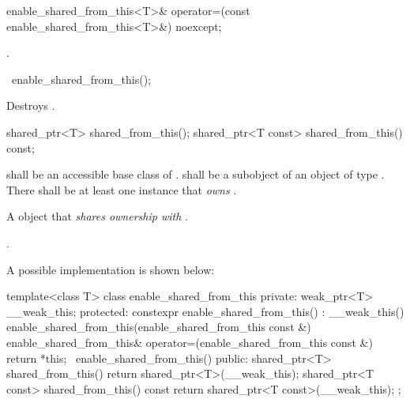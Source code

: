 %
%
\begin{itemdecl}
enable_shared_from_this<T>& operator=(const enable_shared_from_this<T>&) noexcept;
\end{itemdecl}

\begin{itemdescr}
\pnum\returns  {}.
\end{itemdescr}

\begin{itemdecl}
~enable_shared_from_this();
\end{itemdecl}

\begin{itemdescr}
\pnum\effects  Destroys .
\end{itemdescr}

%
%
%
\begin{itemdecl}
shared_ptr<T>       shared_from_this();
shared_ptr<T const> shared_from_this() const;
\end{itemdecl}

\begin{itemdescr}
\pnum\requires  {} shall be an accessible base
class of .  shall be a subobject of an object  of
type . There shall be at least one  instance 
that \textit{owns} .

\pnum\returns  A  object 
that \textit{shares ownership with} .

\pnum\postconditions  {}.
\end{itemdescr}

\pnum
\enternote A possible implementation is shown below:
\begin{codeblock}
template<class T> class enable_shared_from_this {
private:
  weak_ptr<T> __weak_this;
protected:
  constexpr enable_shared_from_this() : __weak_this() { }
  enable_shared_from_this(enable_shared_from_this const &) { }
  enable_shared_from_this& operator=(enable_shared_from_this const &) { return *this; }
  ~enable_shared_from_this() { }
public:
  shared_ptr<T> shared_from_this() { return shared_ptr<T>(__weak_this); }
  shared_ptr<T const> shared_from_this() const { return shared_ptr<T const>(__weak_this); }
};
\end{codeblock}

